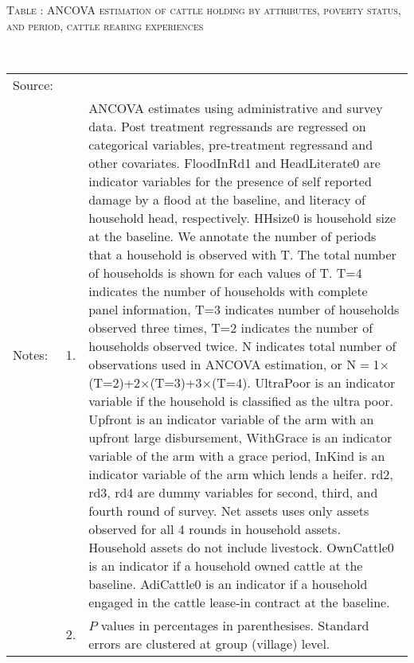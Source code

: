 \vspace{-1cm}\hspace{-1cm}\begin{minipage}[t]{14cm}
\hfil\textsc{\normalsize Table \thetable: ANCOVA estimation of cattle holding by attributes, poverty status, and period, cattle rearing experiences\label{tab ANCOVA NumCows Experience timevarying poverty status attributes}}\\
\setlength{\tabcolsep}{1pt}
\setlength{\baselineskip}{8pt}
\renewcommand{\arraystretch}{.52}
\hfil{}\\
\renewcommand{\arraystretch}{.8}
\setlength{\tabcolsep}{1pt}
\begin{tabular}{>{\hfill\scriptsize}p{1cm}<{}>{\hfill\scriptsize}p{.25cm}<{}>{\scriptsize}p{12cm}<{\hfill}}
Source:& \multicolumn{2}{l}{\scriptsize Estimated with GUK administrative and survey data.}\\
Notes: & 1. & ANCOVA estimates using administrative and survey data. Post treatment regressands are regressed on categorical variables, pre-treatment regressand and other covariates. \textsf{FloodInRd1} and \textsf{HeadLiterate0} are indicator variables for the presence of self reported damage by a flood at the baseline, and literacy of household head, respectively. \textsf{HHsize0} is household size at the baseline. We annotate the number of periods that a household is observed with \textsf{T}. The total number of households is shown for each values of \textsf{T}. \textsf{T=4} indicates the number of households with complete panel information, \textsf{T=3} indicates number of households observed three times, \textsf{T=2} indicates the number of households observed twice. \textsf{N} indicates total number of observations used in ANCOVA estimation, or \textsf{N$=$1$\times$(T=2)+2$\times$(T=3)+3$\times$(T=4)}.  \textsf{UltraPoor} is an indicator variable if the household is classified as the ultra poor. \textsf{Upfront} is an indicator variable of the arm with an upfront large disbursement, \textsf{WithGrace} is an indicator variable of the arm with a grace period, \textsf{InKind} is an indicator variable of the arm which lends a heifer. \textsf{rd2, rd3, rd4} are dummy variables for second, third, and fourth round of survey.  Net assets uses only assets observed for all 4 rounds in household assets. Household assets do not include livestock. \textsf{OwnCattle0} is an indicator if a household owned cattle at the baseline. \textsf{AdiCattle0} is an indicator if a household engaged in the cattle lease-in contract at the baseline.  \\
& 2. & $P$ values in percentages in parenthesises. Standard errors are clustered at group (village) level.
\end{tabular}
\end{minipage}

